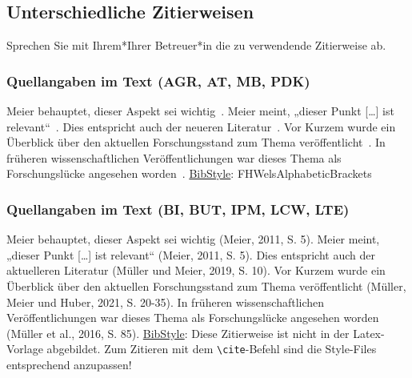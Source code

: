 \subsection{Unterschiedliche Zitierweisen}
\label{sec: ZitierStil}
Sprechen Sie mit Ihrem*Ihrer Betreuer*in die zu verwendende Zitierweise ab.

\subsubsection{Quellangaben im Text (AGR, AT, MB, PDK)}
Meier behauptet, dieser Aspekt sei wichtig~.\newline
Meier meint, „dieser Punkt […] ist relevant“~.\newline
Dies entspricht auch der neueren Literatur~.\newline
Vor Kurzem wurde ein Überblick über den aktuellen Forschungsstand zum Thema veröffentlicht~.\newline
In früheren wissenschaftlichen Veröffentlichungen war dieses Thema als Forschungslücke angesehen worden~.\newline
\underline{BibStyle}: \textsf{FHWelsAlphabeticBrackets}


\subsubsection{Quellangaben im Text (BI, BUT, IPM, LCW, LTE)}
Meier behauptet, dieser Aspekt sei wichtig (Meier, 2011, S. 5).\newline
Meier meint, „dieser Punkt […] ist relevant“ (Meier, 2011, S. 5).\newline
Dies entspricht auch der aktuelleren Literatur (Müller und Meier, 2019, S. 10).\newline
Vor Kurzem wurde ein Überblick über den aktuellen Forschungsstand zum Thema veröffentlicht 
(Müller, Meier und Huber, 2021, S. 20-35).\newline
In früheren wissenschaftlichen Veröffentlichungen war dieses Thema als Forschungslücke angesehen worden (Müller et al., 2016, S. 85).\newline
\underline{BibStyle}: Diese Zitierweise ist nicht in der Latex-Vorlage abgebildet. Zum Zitieren mit dem
\verb|\cite|-Befehl sind die Style-Files entsprechend anzupassen!


